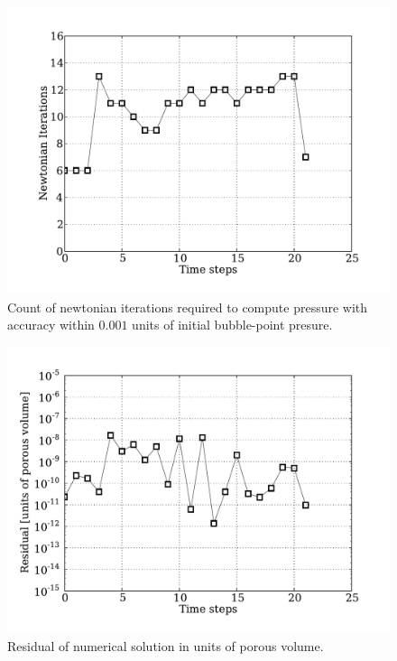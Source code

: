 \documentclass[authoryear,preprint,review,12pt]{elsarticle}
\begin{document}
\begin{figure}
\centering
\includegraphics[width=\linewidth]{./python/matbal_iter}
\caption{Count of newtonian iterations required to compute pressure with accuracy within $0.001$ units of initial bubble-point presure.}
\label{fig: iter}
\end{figure}

\begin{figure}
\centering
\includegraphics[width=\linewidth]{./python/matbal_residual}
\caption{Residual of numerical solution in units of porous volume.}
\label{fig: residual}
\end{figure}
\end{document}
